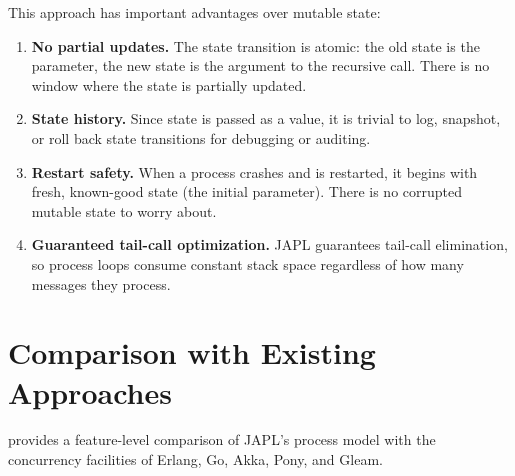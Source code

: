 \documentclass[11pt,a4paper]{article}
\begin{document}
This approach has important advantages over mutable state:

\begin{enumerate}
\item \textbf{No partial updates.} The state transition is atomic: the old state is the parameter, the new state is the argument to the recursive call. There is no window where the state is partially updated.

\item \textbf{State history.} Since state is passed as a value, it is trivial to log, snapshot, or roll back state transitions for debugging or auditing.

\item \textbf{Restart safety.} When a process crashes and is restarted, it begins with fresh, known-good state (the initial parameter). There is no corrupted mutable state to worry about.

\item \textbf{Guaranteed tail-call optimization.} JAPL guarantees tail-call elimination, so process loops consume constant stack space regardless of how many messages they process.
\end{enumerate}


\section{Comparison with Existing Approaches}\label{sec:comparison}

 provides a feature-level comparison of JAPL's process model with the concurrency facilities of Erlang, Go, Akka, Pony, and Gleam.
\end{document}
